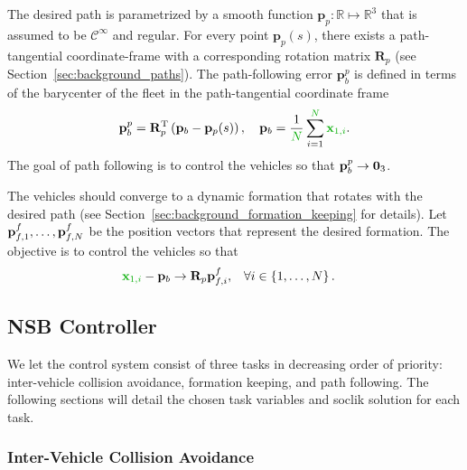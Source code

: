 The desired path is parametrized by a smooth function $\mathbf{p}_p : \mathbb{R} \mapsto \mathbb{R}^3$ that is assumed to be $\mathcal{C}^\infty$ and regular.
For every point $\mathbf{p}_p(s)$, there exists a path-tangential coordinate-frame with a corresponding rotation matrix $\mathbf{R}_p$ (see Section~\ref{sec:background_paths}). 
The path-following error $\mathbf{p}_b^p$ is defined in terms of the barycenter of the fleet in the path-tangential coordinate frame
\begin{equation}
    \mathbf{p}_b^p = \mathbf{R}_p\T\left(\mathbf{p}_b - \mathbf{p}_p(s)\right), \quad \mathbf{p}_b = \frac{1}{\dm{N}}\sum_{i=1}^{\dm{N}} \dm{\mathbf{x}_{1,i}}.
\end{equation}
The goal of path following is to control the vehicles so that $\mathbf{p}_b^p \rightarrow \mathbf{0}_3$.

The vehicles should converge to a dynamic formation that rotates with the desired path (see Section~\ref{sec:background_formation_keeping} for details).
Let $\mathbf{p}_{f,1}^f, \ldots, \mathbf{p}_{f,N}^f$ be the position vectors that represent the desired formation.
The objective is to control the vehicles so that
\begin{align}
    \dm{\mat{x}_{1,i}} - \mat{p}_b &\rightarrow \mat{R}_p \mat{p}_{f,i}^f, &
    \forall i &\in \left\{1, \ldots, N \right\}.
\end{align}

\subsection{NSB Controller}\label{sec:NSB_case_study}

We let the control system consist of three tasks in decreasing order of priority: inter-vehicle collision avoidance, formation keeping, and path following. The following sections will detail the chosen task variables and \gls{soclik} solution for each task.

\subsubsection{Inter-Vehicle Collision Avoidance}

